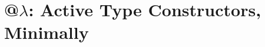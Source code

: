 \documentclass[9pt,preprint]{sigplanconf}
\newcommand{\FF}[1]{{\sf #1}}
\newcommand{\lstinlinep}[1]{\lstinline[language=Python,basicstyle=\ttfamily\small]{#1}}
\begin{document}





\section{@$\lambda$: Active Type Constructors, Minimally}\label{theory}
\newcommand{\cev}[1]{\reflectbox{\ensuremath{\vec{\reflectbox{\ensuremath{#1}}}}}}
\newcommand{\tri}{i}
\newcommand{\trt}{\cev\tau}
\renewcommand{\tnil}[1]{[]}
\newcommand{\ltxt}[1]{\ell_{\text{#1}}}
\newcommand{\abslbl}[1]{\FF{lbl}[{\texttt{#1}}]}
\end{document}

